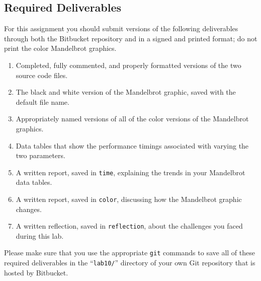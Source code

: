 \vspace{-0.15in}
\subsection*{Required Deliverables}
\vspace{-0.05in}

For this assignment you should submit versions of the following deliverables through both the Bitbucket
repository and in a signed and printed format; do not print the color Mandelbrot graphics.

\vspace{-0.125in}
\begin{enumerate}
    \setlength{\itemsep}{0pt}

  \item Completed, fully commented, and properly formatted versions of the two source code files.
  \item The black and white version of the Mandelbrot graphic, saved with the default file name.
  \item Appropriately named versions of all of the color versions of the Mandelbrot graphics.
  \item Data tables that show the performance timings associated with varying the two parameters.
  \item A written report, saved in {\tt time}, explaining the trends in your Mandelbrot data tables.
  \item A written report, saved in {\tt color}, discussing how the Mandelbrot graphic changes.
  \item A written reflection, saved in {\tt reflection}, about the challenges you faced during this lab.

\end{enumerate}
\vspace{-0.1in}

Please make sure that you use the appropriate {\tt git} commands to save all of these required deliverables in the
``{\tt lab10/}'' directory of your own Git repository that is hosted by Bitbucket.




